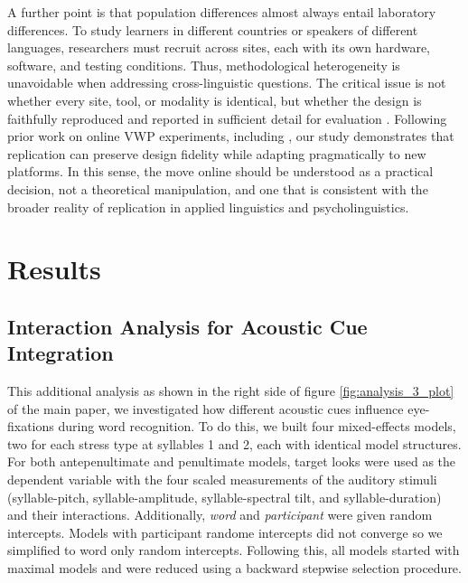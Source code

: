\documentclass[sn-apa]{sn-jnl} %
\begin{document}
A further point is that population differences almost always entail laboratory
differences. To study learners in different countries or speakers of different
languages, researchers must recruit across sites, each with its own hardware,
software, and testing conditions. Thus, methodological heterogeneity is
unavoidable when addressing cross-linguistic questions. The critical issue is
not whether every site, tool, or modality is identical, but whether the design
is faithfully reproduced and reported in sufficient detail for evaluation
\parencite{mcmanus2024}. Following prior work on online VWP experiments,
including \textcite{bramlett2023}, our study demonstrates that replication can
preserve design fidelity while adapting pragmatically to new platforms. In this
sense, the move online should be understood as a practical decision, not a theoretical manipulation, and one that is consistent with the broader reality of replication in applied linguistics and psycholinguistics.

\section{Results}

\subsection{Interaction Analysis for Acoustic Cue Integration}

This additional analysis as shown in the right side of figure \ref{fig:analysis_3_plot} of the main paper, we investigated how different acoustic cues influence eye-fixations during word recognition. To do this, we built four mixed-effects models, two for each stress type at syllables 1 and 2, each with identical model structures. For both antepenultimate and penultimate models, target looks were used as the dependent variable with the four scaled measurements of the auditory stimuli (syllable-pitch, syllable-amplitude, syllable-spectral tilt, and syllable-duration) and their interactions. Additionally, \textit{word} and \textit{participant} were given random intercepts. Models with participant randome intercepts did not converge so we simplified to word only random intercepts. Following this, all models started with maximal models and were reduced using a backward stepwise selection procedure. 
\end{document}
